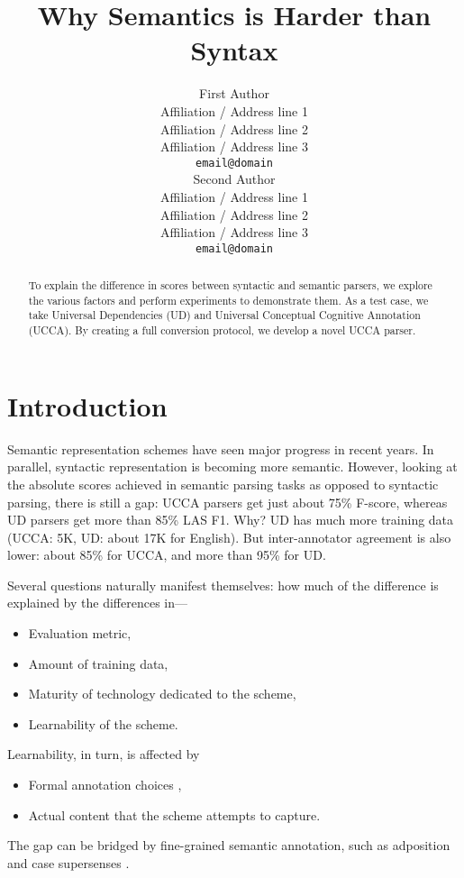 \documentclass[11pt,a4paper]{article}
\title{Why Semantics is Harder than Syntax}
\author{First Author \\
  Affiliation / Address line 1 \\
  Affiliation / Address line 2 \\
  Affiliation / Address line 3 \\
  {\tt email@domain} \\\And
  Second Author \\
  Affiliation / Address line 1 \\
  Affiliation / Address line 2 \\
  Affiliation / Address line 3 \\
  {\tt email@domain} \\}
\date{}
\begin{document}
\maketitle

\begin{abstract}
To explain the difference in scores between syntactic and semantic parsers,
we explore the various factors and perform experiments to demonstrate them.
As a test case, we take Universal Dependencies (UD) and
Universal Conceptual Cognitive Annotation (UCCA).
By creating a full conversion protocol, we develop a novel UCCA parser.
\end{abstract}

\section{Introduction}\label{sec:introduction}

Semantic representation schemes have seen major progress in recent years.
In parallel, syntactic representation is becoming more semantic.
However, looking at the absolute scores achieved in semantic parsing tasks
as opposed to syntactic parsing,
there is still a gap:
UCCA parsers get just about 75\% F-score, whereas UD parsers get more than 85\% LAS F1. Why?
UD has much more training data (UCCA: 5K, UD: about 17K for English).
But inter-annotator agreement is also lower: about 85\% for UCCA, and more than 95\% for UD.

Several questions naturally manifest themselves:
how much of the difference is explained by the differences in---
\begin{itemize}
\item Evaluation metric,
\item Amount of training data,
\item Maturity of technology dedicated to the scheme,
\item Learnability of the scheme.
\end{itemize}

Learnability, in turn, is affected by
\begin{itemize}
\item Formal annotation choices \cite{Schwartz:12},
\item Actual content that the scheme attempts to capture.
\end{itemize}


The gap can be bridged by fine-grained semantic annotation,
such as adposition and case supersenses
\cite{schneider2017adposition,blodgett2018semantic}.
\end{document}
